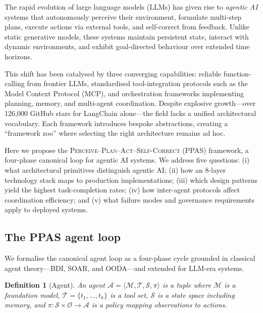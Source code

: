 \documentclass[10pt]{article}
\newtheorem{definition}{Definition}
\begin{document}
The rapid evolution of large language models (LLMs) has given rise to \emph{agentic AI} systems that autonomously perceive their environment, formulate multi-step plans, execute actions via external tools, and self-correct from feedback\cite{yao2023react,shinn2023reflexion,wang2024survey}. Unlike static generative models, these systems maintain persistent state, interact with dynamic environments, and exhibit goal-directed behaviour over extended time horizons.

This shift has been catalysed by three converging capabilities: reliable function-calling from frontier LLMs\cite{openai2024gpt4o,anthropic2024claude}, standardised tool-integration protocols such as the Model Context Protocol (MCP)\cite{anthropic2024mcp}, and orchestration frameworks implementing planning, memory, and multi-agent coordination\cite{langchain2024langgraph,microsoft2024autogen}. Despite explosive growth---over 126,000 GitHub stars for LangChain alone---the field lacks a unified architectural vocabulary. Each framework introduces bespoke abstractions, creating a ``framework zoo'' where selecting the right architecture remains ad hoc.

Here we propose the \textsc{Perceive--Plan--Act--Self-Correct} (PPAS) framework, a four-phase canonical loop for agentic AI systems. We address five questions: (i) what architectural primitives distinguish agentic AI; (ii) how an 8-layer technology stack maps to production implementations; (iii) which design patterns yield the highest task-completion rates; (iv) how inter-agent protocols affect coordination efficiency; and (v) what failure modes and governance requirements apply to deployed systems.

\subsection*{The PPAS agent loop}

We formalise the canonical agent loop as a four-phase cycle grounded in classical agent theory---BDI\cite{rao1995bdi}, SOAR\cite{laird2012soar}, and OODA\cite{boyd1987ooda}---and extended for LLM-era systems.

\begin{definition}[Agent]
An agent $\mathcal{A} = \langle \mathcal{M}, \mathcal{T}, \mathcal{S}, \pi \rangle$ is a tuple where $\mathcal{M}$ is a foundation model, $\mathcal{T} = \{t_1, \ldots, t_k\}$ is a tool set, $\mathcal{S}$ is a state space including memory, and $\pi: \mathcal{S} \times \mathcal{O} \rightarrow \mathcal{A}$ is a policy mapping observations to actions.
\end{definition}
\end{document}
